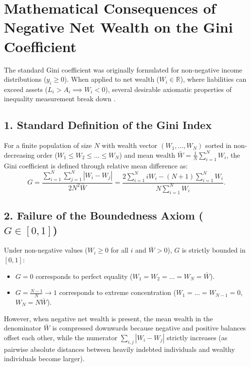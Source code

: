 \section{Mathematical Consequences of Negative Net Wealth on the Gini Coefficient}\label{app:gini-negative}

The standard Gini coefficient was originally formulated for non-negative income distributions ($y_i \ge 0$). When applied to net wealth ($W_i \in \mathbb{R}$), where liabilities can exceed assets ($L_i > A_i \implies W_i < 0$), several desirable axiomatic properties of inequality measurement break down \citep{chen1982relative,raffinetti2015does}.

\subsection*{1. Standard Definition of the Gini Index}
For a finite population of size $N$ with wealth vector $(W_1, \dots, W_N)$ sorted in non-decreasing order ($W_1 \le W_2 \le \dots \le W_N$) and mean wealth $\bar{W} = \frac{1}{N}\sum_{i=1}^N W_i$, the Gini coefficient is defined through relative mean difference as:
\begin{equation}
    G = \frac{\sum_{i=1}^N \sum_{j=1}^N |W_i - W_j|}{2 N^2 \bar{W}} = \frac{2 \sum_{i=1}^N i W_i - (N + 1)\sum_{i=1}^N W_i}{N \sum_{i=1}^N W_i}.
    \label{eq:gini_def}
\end{equation}

\subsection*{2. Failure of the Boundedness Axiom ($G \in [0, 1]$)}
Under non-negative values ($W_i \ge 0$ for all $i$ and $\bar{W} > 0$), $G$ is strictly bounded in $[0, 1]$:
\begin{itemize}
    \item $G = 0$ corresponds to perfect equality ($W_1 = W_2 = \dots = W_N = \bar{W}$).
    \item $G = \frac{N-1}{N} \to 1$ corresponds to extreme concentration ($W_1 = \dots = W_{N-1} = 0$, $W_N = N\bar{W}$).
\end{itemize}

However, when negative net wealth is present, the mean wealth in the denominator $\bar{W}$ is compressed downwards because negative and positive balances offset each other, while the numerator $\sum_{i,j} |W_i - W_j|$ strictly increases (as pairwise absolute distances between heavily indebted individuals and wealthy individuals become larger).

